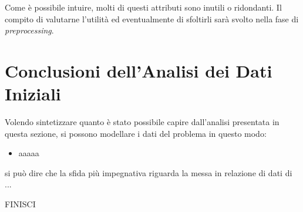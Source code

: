 Come è possibile intuire, molti di questi attributi sono inutili o ridondanti. Il compito di valutarne l'utilità ed eventualmente di sfoltirli sarà svolto nella fase di \textit{preprocessing}.

\section{Conclusioni dell'Analisi dei Dati Iniziali}

Volendo sintetizzare quanto è stato possibile capire dall'analisi presentata in questa sezione, si possono modellare i dati del problema in questo modo:

\begin{itemize}
	\item aaaaa
\end{itemize}

si può dire che la sfida più impegnativa riguarda la messa in relazione di dati di ...

FINISCI
